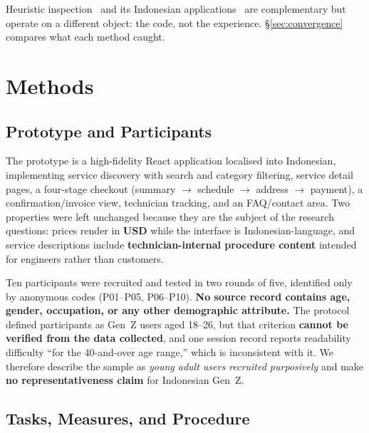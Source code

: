 \documentclass[conference]{IEEEtran}
\begin{document}
Heuristic inspection~\cite{nielsen} and its Indonesian
applications~\cite{perdanakusuma,febriyanthi,rabila,frobenius} are
complementary but operate on a different object: the code, not the
experience. \S\ref{sec:convergence} compares what each method caught.

\section{Methods}
\label{sec:methods}

\subsection{Prototype and Participants}

The prototype is a high-fidelity React application localised into
Indonesian, implementing service discovery with search and category
filtering, service detail pages, a four-stage checkout (summary
$\rightarrow$ schedule $\rightarrow$ address $\rightarrow$ payment), a
confirmation/invoice view, technician tracking, and an FAQ/contact area.
Two properties were left unchanged because they are the subject of the
research questions: prices render in \textbf{USD} while the interface is
Indonesian-language, and service descriptions include
\textbf{technician-internal procedure content} intended for engineers
rather than customers.

Ten participants were recruited and tested in two rounds of five,
identified only by anonymous codes (P01--P05, P06--P10). \textbf{No source
record contains age, gender, occupation, or any other demographic
attribute.} The protocol defined participants as Gen~Z users aged 18--26,
but that criterion \textbf{cannot be verified from the data collected},
and one session record reports readability difficulty ``for the
40-and-over age range,'' which is inconsistent with it. We therefore
describe the sample as \emph{young adult users recruited purposively} and
make \textbf{no representativeness claim} for Indonesian Gen~Z.

\subsection{Tasks, Measures, and Procedure}
\end{document}

